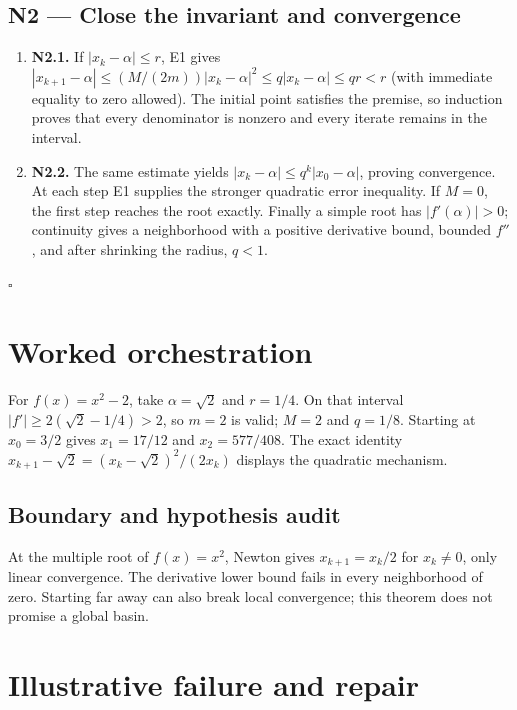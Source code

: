 \documentclass[preprint,12pt,aps,pra,showkeys,amsmath,amssymb,superscriptaddress,floatfix]{revtex4-2}
\theoremstyle{definition}
\theoremstyle{remark}
\begin{document}
\subsection{N2 --- Close the invariant and
convergence}\label{n2-close-the-invariant-and-convergence}

\begin{enumerate}
\def\labelenumi{\arabic{enumi}.}
\item
  \textbf{N2.1.} If \(|x_k-\alpha|\le r\), E1 gives
  \(|x_{k+1}-\alpha|\le(M/(2m))|x_k-\alpha|^2\le q|x_k-\alpha|\le qr<r\)
  (with immediate equality to zero allowed). The initial point satisfies
  the premise, so induction proves that every denominator is nonzero and
  every iterate remains in the interval.
\item
  \textbf{N2.2.} The same estimate yields
  \(|x_k-\alpha|\le q^k|x_0-\alpha|\), proving convergence. At each step
  E1 supplies the stronger quadratic error inequality. If \(M=0\), the
  first step reaches the root exactly. Finally a simple root has
  \(|f'(\alpha)|>0\); continuity gives a neighborhood with a positive
  derivative bound, bounded \(f''\), and after shrinking the radius,
  \(q<1\).
\end{enumerate}

\hfill$\square$

\section{Worked orchestration}

For \(f(x)=x^2-2\), take \(\alpha=\sqrt2\) and \(r=1/4\). On that
interval \(|f'|\ge2(\sqrt2-1/4)>2\), so \(m=2\) is valid; \(M=2\) and
\(q=1/8\). Starting at \(x_0=3/2\) gives \(x_1=17/12\) and
\(x_2=577/408\). The exact identity
\(x_{k+1}-\sqrt2=(x_k-\sqrt2)^2/(2x_k)\) displays the quadratic
mechanism.

\subsection{Boundary and hypothesis audit}

At the multiple root of \(f(x)=x^2\), Newton gives \(x_{k+1}=x_k/2\) for
\(x_k\ne0\), only linear convergence. The derivative lower bound fails
in every neighborhood of zero. Starting far away can also break local
convergence; this theorem does not promise a global basin.

\section{Illustrative failure and repair}
\end{document}
